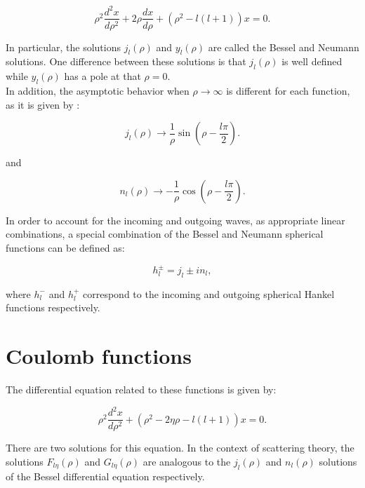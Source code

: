 \documentclass[openany]{book}
\begin{document}
\begin{equation} \label{eq:special_bessel_diffEquation}
	\rho^2 \frac{d^2x}{d\rho^2} + 2\rho \frac{dx}{d\rho} + (\rho^2 - l(l+1))x= 0.
\end{equation}

In particular, the solutions $j_l(\rho)$ and $y_l(\rho)$ are called the Bessel and Neumann solutions. One difference between these solutions is that $j_l(\rho)$ is well defined while $y_l(\rho)$  has a pole at that $\rho = 0$.   \\

In addition, the asymptotic behavior when $\rho \rightarrow \infty$ is different for each function, as it is given by \cite{joachain_1975}:

\begin{equation} \label{eq:special_bessel_J}
	j_l(\rho) \rightarrow  \frac{1}{\rho} \sin{\left(\rho - \frac{l\pi}{2}\right)}.
\end{equation}

and

\begin{equation} \label{eq:special_bessel_Y}
	n_l(\rho) \rightarrow -\frac{1}{\rho}\cos{\left(\rho - \frac{l\pi}{2}\right)}.
\end{equation}

In order to account for the incoming and outgoing waves, as appropriate linear combinations, a special combination of the Bessel and Neumann spherical functions can be defined as:

\begin{equation}\label{eq:special_hankel}
	h^{\pm}_{l} = j_{l} \pm in_{l},
\end{equation}

where $h^{-}_{l}$ and $h^{+}_{l}$ correspond to the incoming and outgoing spherical Hankel functions respectively. \\

\section{Coulomb functions} \label{sec:coulomb}

The differential equation related to these functions is given by:

\begin{equation}  \label{eq:special_coulomb_diffEquation}
	\rho^2 \frac{d^2x}{d\rho^2}+ (\rho^2 - 2\eta \rho  - l(l+1) )x= 0.
\end{equation}

There are two solutions for this equation. In the context of scattering theory, the solutions $F_{l\eta}(\rho)$ and $G_{l\eta}(\rho)$ are analogous to the  $j_l(\rho)$ and $n_l(\rho)$ solutions of the Bessel differential equation respectively.  \\
\end{document}
